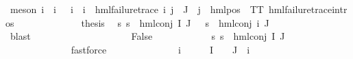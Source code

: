 \begin{isabellebody}
\ {\isacharparenleft}{\kern0pt}meson\ {\isacartoucheopen}{\isasymexists}i{\isasymin}{\isasymPsi}\ {\isacharbackquote}{\kern0pt}\ {\isacharbraceleft}{\kern0pt}i{\isacharunderscore}{\kern0pt}{\isasymphi}{\isacharbraceright}{\kern0pt}{\isachardot}{\kern0pt}\ {\isasymPsi}\ {\isacharbackquote}{\kern0pt}\ {\isacharbraceleft}{\kern0pt}i{\isacharunderscore}{\kern0pt}{\isasymphi}{\isacharbraceright}{\kern0pt}\ {\isacharequal}{\kern0pt}\ {\isacharbraceleft}{\kern0pt}i{\isacharbraceright}{\kern0pt}\ {\isasymand}\ hml{\isacharunderscore}{\kern0pt}failure{\isacharunderscore}{\kern0pt}trace\ i{\isacartoucheclose}\ {\isacartoucheopen}{\isasymforall}j{\isasymin}{\isasymPsi}\ {\isacharbackquote}{\kern0pt}\ J{\isachardot}{\kern0pt}\ {\isasymexists}{\isasymalpha}{\isachardot}{\kern0pt}\ j\ {\isacharequal}{\kern0pt}\ hml{\isacharunderscore}{\kern0pt}pos\ {\isasymalpha}\ TT{\isacartoucheclose}\ hml{\isacharunderscore}{\kern0pt}failure{\isacharunderscore}{\kern0pt}trace{\isachardot}{\kern0pt}intros{\isacharparenleft}{\kern0pt}{}{\isacharparenright}{\kern0pt}{\isacharparenright}{\kern0pt}\isanewline
\ \ \ \ \ \ \ \ \ \ \isamarkupfalse%
\ \isamarkupfalse%
\ {\isacharquery}{\kern0pt}thesis\ \isamarkupfalse%
\ {\isacartoucheopen}{\isasymforall}s{\isachardot}{\kern0pt}\ s\ {\isasymTurnstile}\ {\isacharparenleft}{\kern0pt}hml{\isacharunderscore}{\kern0pt}conj\ I\ J\ {\isasymPhi}{\isacharparenright}{\kern0pt}\ {\isasymlongleftrightarrow}\ s\ {\isasymTurnstile}\ {\isacharparenleft}{\kern0pt}hml{\isacharunderscore}{\kern0pt}conj\ {\isacharbraceleft}{\kern0pt}i{\isacharunderscore}{\kern0pt}{\isasymphi}{\isacharbraceright}{\kern0pt}\ J\ {\isasymPsi}{\isacharparenright}{\kern0pt}{\isacartoucheclose}\isanewline
\ \ \ \ \ \ \ \ \ \ \ \ \isamarkupfalse%
\ blast\isanewline
\ \ \ \ \ \ \ \ \isamarkupfalse%
\isanewline
\ \ \ \ \ \ \ \ \ \ \isamarkupfalse%
\ False\isanewline
\ \ \ \ \ \ \ \ \ \ \isamarkupfalse%
\ {\isachardoublequoteopen}{\isasymforall}s{\isachardot}{\kern0pt}\ {\isasymnot}{\isacharparenleft}{\kern0pt}s\ {\isasymTurnstile}\ hml{\isacharunderscore}{\kern0pt}conj\ I\ J\ {\isasymPhi}{\isacharparenright}{\kern0pt}{\isachardoublequoteclose}\ \isanewline
\ \ \ \ \ \ \ \ \ \ \ \ \isamarkupfalse%
\ fastforce\isanewline
\ \ \ \ \ \ \ \ \ \ \isamarkupfalse%
\ \isamarkupfalse%
\ {\isasymphi}\ i{\isacharunderscore}{\kern0pt}{\isasymphi}\ \ {\isachardoublequoteopen}{\isasymphi}\ {\isasymin}\ {\isasymPhi}\ {\isacharbackquote}{\kern0pt}\ I\ {\isasyminter}\ {\isasymPhi}\ {\isacharbackquote}{\kern0pt}\ J{\isachardoublequoteclose}\ {\isachardoublequoteopen}{\isasymPhi}\ i{\isacharunderscore}{\kern0pt}{\isasymphi}\ {\isacharequal}{\kern0pt}\ {\isasymphi}{\isachardoublequoteclose}\ \isanewline

\end{isabellebody}
